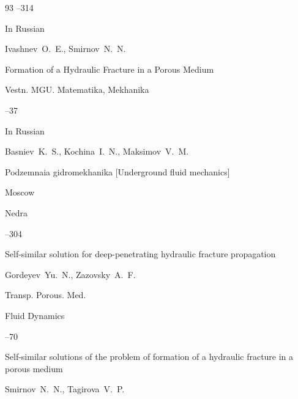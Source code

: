 \begin{thebibliography}{93}
--314









\lang In Russian

\by Ivashnev~O.~E.,  Smirnov~N.~N.

\paper Formation of a Hydraulic Fracture in a Porous Medium

\jour Vestn. MGU. Matematika, Mekhanika



--37




\lang In Russian

\by Basniev~K.~S., Kochina~I.~N., Maksimov~V.~M.

\book Podzemnaia gidromekhanika \rm [Underground fluid mechanics]

\publaddr Moscow

\publ Nedra









–304

\paper Self-similar solution for deep-penetrating hydraulic fracture propagation

\by  Gordeyev~Yu.~N., Zazovsky~A.~F.


\jour Transp. Porous. Med.






\jour Fluid Dynamics




–70

\paper Self-similar solutions of the problem of formation of a hydraulic fracture in a porous medium

\by  Smirnov~N.~N.,  Tagirova~V.~P.


\end{thebibliography}
